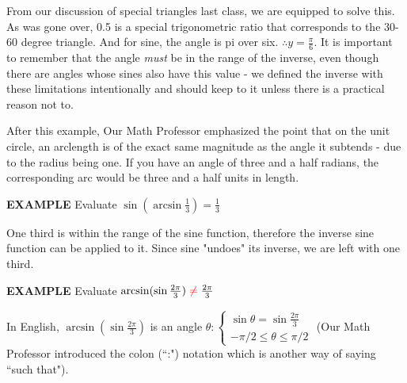 \documentclass{article}
\begin{document}
From our discussion of special triangles last class, we are equipped to solve this. As was gone over, 0.5 is a special trigonometric ratio that corresponds to the 30-60 degree triangle. And for sine, the angle is pi over six. $\therefore y=\frac{\pi}{6}$. It is important to remember that the angle \textit{must} be in the range of the inverse, even though there are angles whose sines also have this value - we defined the inverse with these limitations intentionally and should keep to it unless there is a practical reason not to.

\vspace{10pt}

After this example, Our Math Professor emphasized the point that on the unit circle, an arclength is of the exact same magnitude as the angle it subtends - due to the radius being one. If you have an angle of three and a half radians, the corresponding arc would be three and a half units in length.

\vspace{10pt}

{\bf{}EXAMPLE} Evaluate $\sin(\arcsin\frac{1}{3})=\frac{1}{3}$

\vspace{10pt}

One third is within the range of the sine function, therefore the inverse sine function can be applied to it. Since sine "undoes" its inverse, we are left with one third.

\vspace{10pt}

{\bf{}EXAMPLE} Evaluate $\arcsin(\sin\frac{2\pi}{3})\color{red}\neq\color{black}\frac{2\pi}{3}$

\vspace{10pt}

In English, $\arcsin(\sin\frac{2\pi}{3})$ is an angle $\theta:\left\{\begin{array}{c}\sin\theta=\sin\frac{2\pi}{3}\\-\pi/2\leq\theta\leq\pi/2\end{array}\right.$ (Our Math Professor introduced the colon (``:") notation which is another way of saying  ``such that").

\begin{center}
\end{center}
\end{document}
